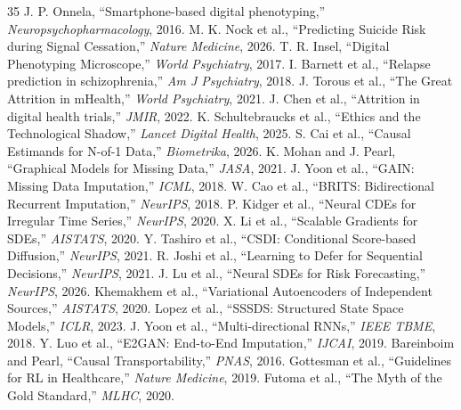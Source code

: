 \documentclass[journal]{IEEEtran}
\begin{document}

\begin{thebibliography}{35}
 J. P. Onnela, ``Smartphone-based digital phenotyping,'' \textit{Neuropsychopharmacology}, 2016.
 M. K. Nock et al., ``Predicting Suicide Risk during Signal Cessation,'' \textit{Nature Medicine}, 2026.
 T. R. Insel, ``Digital Phenotyping Microscope,'' \textit{World Psychiatry}, 2017.
 I. Barnett et al., ``Relapse prediction in schizophrenia,'' \textit{Am J Psychiatry}, 2018.
 J. Torous et al., ``The Great Attrition in mHealth,'' \textit{World Psychiatry}, 2021.
 J. Chen et al., ``Attrition in digital health trials,'' \textit{JMIR}, 2022.
 K. Schultebraucks et al., ``Ethics and the Technological Shadow,'' \textit{Lancet Digital Health}, 2025.
 S. Cai et al., ``Causal Estimands for N-of-1 Data,'' \textit{Biometrika}, 2026.
 K. Mohan and J. Pearl, ``Graphical Models for Missing Data,'' \textit{JASA}, 2021.
 J. Yoon et al., ``GAIN: Missing Data Imputation,'' \textit{ICML}, 2018.
 W. Cao et al., ``BRITS: Bidirectional Recurrent Imputation,'' \textit{NeurIPS}, 2018.
 P. Kidger et al., ``Neural CDEs for Irregular Time Series,'' \textit{NeurIPS}, 2020.
 X. Li et al., ``Scalable Gradients for SDEs,'' \textit{AISTATS}, 2020.
 Y. Tashiro et al., ``CSDI: Conditional Score-based Diffusion,'' \textit{NeurIPS}, 2021.
 R. Joshi et al., ``Learning to Defer for Sequential Decisions,'' \textit{NeurIPS}, 2021.
 J. Lu et al., ``Neural SDEs for Risk Forecasting,'' \textit{NeurIPS}, 2026.
 Khemakhem et al., ``Variational Autoencoders of Independent Sources,'' \textit{AISTATS}, 2020.
 Lopez et al., ``SSSDS: Structured State Space Models,'' \textit{ICLR}, 2023.
 J. Yoon et al., ``Multi-directional RNNs,'' \textit{IEEE TBME}, 2018.
 Y. Luo et al., ``E2GAN: End-to-End Imputation,'' \textit{IJCAI}, 2019.
 Bareinboim and Pearl, ``Causal Transportability,'' \textit{PNAS}, 2016.
 Gottesman et al., ``Guidelines for RL in Healthcare,'' \textit{Nature Medicine}, 2019.
 Futoma et al., ``The Myth of the Gold Standard,'' \textit{MLHC}, 2020.

\end{thebibliography}
\end{document}
